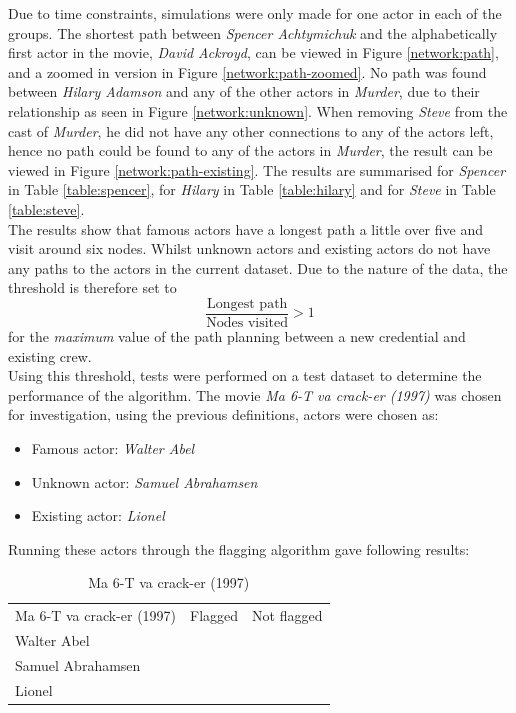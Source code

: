 \documentclass[12pt]{ieeeconf}      %
\newcommand{\xmark}{\ding{55}}%
\begin{document}
\indent Due to time constraints, simulations were only made for one actor in each of the groups. The shortest path between \textit{Spencer Achtymichuk} and the alphabetically first actor in the movie, \textit{David Ackroyd}, can be viewed in Figure \ref{network:path}, and a zoomed in version in Figure \ref{network:path-zoomed}. No path was found between \textit{Hilary Adamson} and any of the other actors in \textit{Murder}, due to their relationship as seen in Figure \ref{network:unknown}. When removing \textit{Steve} from the cast of \textit{Murder}, he did not have any other connections to any of the actors left, hence no path could be found to any of the actors in \textit{Murder}, the result can be viewed in Figure \ref{network:path-existing}. The results are summarised for \textit{Spencer} in Table \ref{table:spencer}, for \textit{Hilary} in Table \ref{table:hilary} and for \textit{Steve} in Table \ref{table:steve}.
\\
\indent The results show that famous actors have a longest path a little over five and visit around six nodes. Whilst unknown actors and existing actors do not have any paths to the actors in the current dataset. Due to the nature of the data, the threshold is therefore set to
\begin{equation}
\frac{\text{Longest path}}{\text{Nodes visited}} > 1
\end{equation}
for the \textit{maximum} value of the path planning between a new credential and existing crew.
\\
\indent Using this threshold, tests were performed on a test dataset to determine the performance of the algorithm. The movie \textit{Ma 6-T va crack-er (1997)} was chosen for investigation, using the previous definitions, actors were chosen as:

\begin{itemize}
\item Famous actor: \textit{Walter Abel}
\item Unknown actor: \textit{Samuel Abrahamsen}
\item Existing actor: \textit{Lionel}
\end{itemize}

\noindent Running these actors through the flagging algorithm gave following results:

\begin{table}[H]
\centering
\begin{tabular}{lcc}
Ma 6-T va crack-er (1997) & Flagged & Not flagged \\
Walter Abel &  & \xmark \\
Samuel Abrahamsen & \xmark &  \\
Lionel & \xmark & 
\end{tabular}
\caption{Ma 6-T va crack-er (1997)}
\label{table:results}
\end{table}
\end{document}
